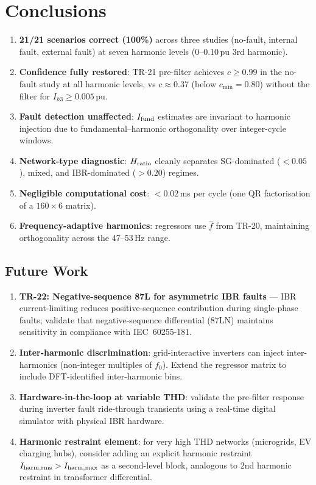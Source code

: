 \documentclass[11pt, a4paper]{article}
\begin{document}
\section{Conclusions}
\label{sec:conclusions}

\begin{enumerate}
  \item \textbf{21/21 scenarios correct (100\%)} across three studies
        (no-fault, internal fault, external fault) at seven harmonic levels
        (0--0.10\,pu 3rd harmonic).
  \item \textbf{Confidence fully restored}: TR-21 pre-filter achieves
        $c \geq 0.99$ in the no-fault study at all harmonic levels,
        vs $c \approx 0.37$ (below $c_{\min}=0.80$) without the filter
        for $I_{h3} \geq 0.005$\,pu.
  \item \textbf{Fault detection unaffected}: $I_{\rm fund}$ estimates are
        invariant to harmonic injection due to fundamental--harmonic
        orthogonality over integer-cycle windows.
  \item \textbf{Network-type diagnostic}: $H_{\rm ratio}$ cleanly separates
        SG-dominated ($< 0.05$), mixed, and IBR-dominated ($> 0.20$) regimes.
  \item \textbf{Negligible computational cost}: $< 0.02$\,ms per cycle
        (one QR factorisation of a $160 \times 6$ matrix).
  \item \textbf{Frequency-adaptive harmonics}: regressors use $\hat{f}$ from
        TR-20, maintaining orthogonality across the 47--53\,Hz range.
\end{enumerate}

\subsection{Future Work}

\begin{enumerate}
  \item \textbf{TR-22: Negative-sequence 87L for asymmetric IBR faults} ---
        IBR current-limiting reduces positive-sequence contribution during
        single-phase faults; validate that negative-sequence differential
        (87LN) maintains sensitivity in compliance with IEC~60255-181.
  \item \textbf{Inter-harmonic discrimination}: grid-interactive inverters
        can inject inter-harmonics (non-integer multiples of $f_0$).
        Extend the regressor matrix to include DFT-identified
        inter-harmonic bins.
  \item \textbf{Hardware-in-the-loop at variable THD}: validate the pre-filter
        response during inverter fault ride-through transients using a
        real-time digital simulator with physical IBR hardware.
  \item \textbf{Harmonic restraint element}: for very high THD networks
        (microgrids, EV charging hubs), consider adding an explicit harmonic
        restraint $I_{\rm harm,rms} > I_{\rm harm,max}$ as a second-level
        block, analogous to 2nd harmonic restraint in transformer differential.
\end{enumerate}




\end{document}
